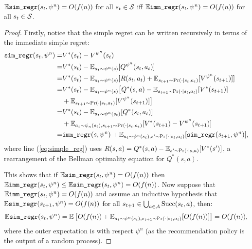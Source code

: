             \begin{lemma} \label{lem:imm_simple_regret}
                $\mathbb{E}{\textnormal{\texttt{sim\_regr}}}(s_t,\psi^n)=O(f(n))$ for all $s_t\in\mathcal{S}$ iff $\mathbb{E}{\textnormal{\texttt{imm\_regr}}}(s_t,\psi^n)=O(f(n))$ for all $s_t\in\mathcal{S}$.
            \end{lemma}
            \begin{proof}
                Firstly, notice that the simple regret can be written recursively in terms of the immediate simple regret:
                \begin{align}
                    {\textnormal{\texttt{sim\_regr}}}(s_t,\psi^n) =& V^*(s_t) - V^{\psi^n}(s_t) \\
                        =& V^*(s_t) - \mathbb{E}_{a_t\sim\psi^n(s)}[Q^{\psi^n}(s_t,a_t)] \\
                        =& V^*(s_t) - \mathbb{E}_{a_t\sim\psi^n(s)}[R(s_t,a_t) +    
                            \mathbb{E}_{s_{t+1}\sim\Pr(\cdot|s_t,a_t)}[V^{\psi^n}(s_{t+1})]] \\
                        =& V^*(s_t) - \mathbb{E}_{a_t\sim\psi^n(s)}\big[Q^*(s,a) - 
                            \mathbb{E}_{s_{t+1}\sim\Pr(\cdot|s_t,a_t)}[V^*(s_{t+1})]  \notag \\
                            &+ \mathbb{E}_{s_{t+1}\sim\Pr(\cdot|s_t,a_t)}[V^{\psi^n}(s_{t+1})]\big] \label{eq:simple_reg} \\
                        =& V^*(s_t) - \mathbb{E}_{a_t\sim\psi^n(s_t)}[Q^*(s_t,a_t)] \notag \\
                            &+ \mathbb{E}_{a_t\sim\psi_n(s_t),s_{t+1}\sim\Pr(\cdot|s_t,a_t)}[
                                V^*(s_{t+1}) - V^{\psi^n}(s_{t+1})] \\
                        =& {\textnormal{\texttt{imm\_regr}}}(s,\psi^n) + 
                            \mathbb{E}_{a_t\sim\psi^n(s_t),s'\sim\Pr(\cdot|s_t,a_t)}[{\textnormal{\texttt{sim\_regr}}}(s_{t+1},\psi^n)], \label{eq:regret_relation}
                \end{align}
                where line (\ref{eq:simple_reg}) uses $R(s,a) = Q^*(s,a) - \mathbb{E}_{s'\sim\Pr(\cdot|s,a)}[V^*(s')]$, a rearrangement of the Bellman optimality equation for $Q^*(s,a)$.
                
                This shows that if $\mathbb{E}{\textnormal{\texttt{sim\_regr}}}(s_t,\psi^n)=O(f(n))$ then $\mathbb{E}{\textnormal{\texttt{imm\_regr}}}(s_t,\psi^n)\leq \mathbb{E}{\textnormal{\texttt{sim\_regr}}}(s_t,\psi^n) = O(f(n))$. Now suppose that $\mathbb{E}{\textnormal{\texttt{imm\_regr}}}(s_t,\psi^n)=O(f(n))$ and assume an inductive hypothesis that $\mathbb{E}{\textnormal{\texttt{sim\_regr}}}(s_{t+1},\psi^n)=O(f(n))$ for all $s_{t+1}\in\bigcup_{a\in\mathcal{A}}{\textnormal{Succ}(s_t,a)}$, then:
                \begin{align}
                    \mathbb{E}{\textnormal{\texttt{sim\_regr}}}(s_t,\psi^n) = \mathbb{E}\left[ O(f(n)) + \mathbb{E}_{a_t\sim\psi^n(s_t),s_{t+1}\sim\Pr(\cdot|s_t,a_t)}[O(f(n))] \right] = O(f(n)),
                \end{align}
                where the outer expectation is with respect $\psi^n$ (as the recommendation policy is the output of a random process).
            \end{proof}
    
